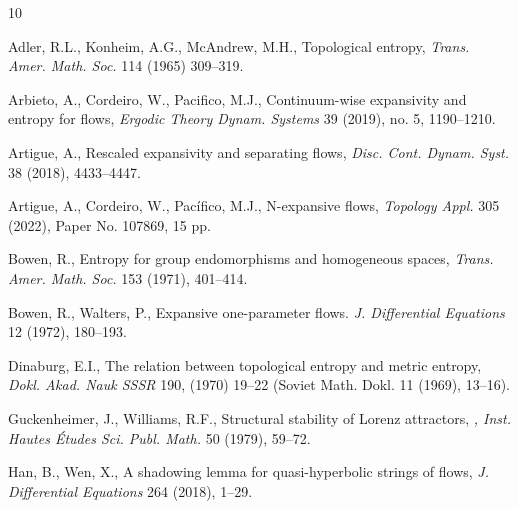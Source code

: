 \documentclass{amsart}
\numberwithin{equation}{section}
\begin{document}
\begin{thebibliography}{10}






Adler, R.L., Konheim, A.G., McAndrew, M.H., 
Topological entropy,
{\em Trans. Amer. Math. Soc.} 114 (1965) 309--319.



 Arbieto, A., Cordeiro, W., Pacifico, M.J.,
 Continuum-wise expansivity and entropy for flows,
 {\em Ergodic Theory Dynam. Systems} 39 (2019), no. 5, 1190--1210.

Artigue, A.,
Rescaled expansivity and separating flows,
{\em Disc. Cont. Dynam. Syst.} 38 (2018), 4433--4447.



Artigue, A., Cordeiro, W., Pacífico, M.J.,
N-expansive flows,
{\em Topology Appl.} 305 (2022), Paper No. 107869, 15 pp.












Bowen, R.,
Entropy for group endomorphisms and homogeneous spaces,
{\em Trans. Amer. Math. Soc.} 153 (1971), 401--414.





Bowen, R., Walters, P.,
Expansive one-parameter flows.
{\em J. Differential Equations} 12 (1972), 180--193.







Dinaburg, E.I.,
The relation between topological entropy and metric entropy,
{\em Dokl. Akad. Nauk SSSR} 190, (1970) 19--22 (Soviet Math. Dokl. 11 (1969), 13--16).








Guckenheimer, J., Williams, R.F.,
Structural stability of Lorenz attractors,
{\em, Inst. Hautes \'Etudes Sci. Publ. Math.} 50 (1979), 59--72.









Han, B., Wen, X.,
A shadowing lemma for quasi-hyperbolic strings of flows,
{\em J. Differential Equations} 264 (2018), 1--29.

















\end{thebibliography}
\end{document}
